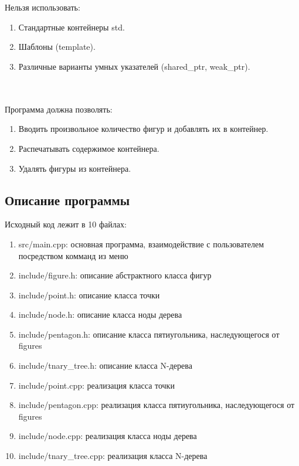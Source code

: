 \documentclass[12pt]{article}
\begin{document}
\\ \\
Нельзя использовать:
\begin{enumerate}
\item Стандартные контейнеры std.
\item Шаблоны (template).
\item Различные варианты умных указателей (shared\_ptr, weak\_ptr).
\end{enumerate}
\\ \\
Программа должна позволять:
\begin{enumerate}
\item Вводить произвольное количество фигур и добавлять их в контейнер.
\item Распечатывать содержимое контейнера.
\item Удалять фигуры из контейнера.
\end{enumerate}

\subsection*{Описание программы}

Исходный код лежит в 10 файлах:
\begin{enumerate}
\item src/main.cpp: основная программа, взаимодействие с пользователем посредством комманд из меню

\item include/figure.h:    описание абстрактного класса фигур

\item include/point.h:     описание класса точки
\item include/node.h:  описание класса ноды дерева
\item include/pentagon.h: описание класса пятиугольника, наследующегося от figures
\item include/tnary\_tree.h:    описание класса N-дерева

\item include/point.cpp:     реализация класса точки
\item include/pentagon.cpp:  реализация класса пятиугольника, наследующегося от figures
\item include/node.cpp: реализация класса ноды дерева
\item include/tnary\_tree.cpp:    реализация класса N-дерева

\end{enumerate}
\end{document}
